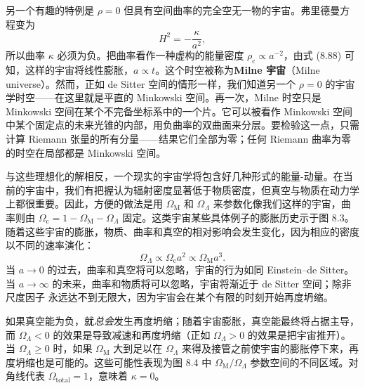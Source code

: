 另一个有趣的特例是 $\rho=0$ 但具有空间曲率的完全空无一物的宇宙。弗里德曼方程变为
\begin{equation*}
H^{2} = -\frac{\kappa}{a^{2}},
\tag{8.90}
\end{equation*}
所以曲率 $\kappa$ 必须为负。把曲率看作一种虚构的能量密度 $\rho_{\mathrm{c}}\propto a^{-2}$，由式 (8.88) 可知，这样的宇宙将线性膨胀，$a\propto t$。这个时空被称为\textbf{Milne 宇宙}（Milne universe）。然而，正如 de Sitter 空间的情形一样，我们知道另一个 $\rho=0$ 的宇宙学时空——在这里就是平直的 Minkowski 空间。再一次，Milne 时空只是 Minkowski 空间在某个不完备坐标系中的一个片。它可以被看作 Minkowski 空间中某个固定点的未来光锥的内部，用负曲率的双曲面来分层。要检验这一点，只需计算 Riemann 张量的所有分量——结果它们全部为零；任何 Riemann 曲率为零的时空在局部都是 Minkowski 空间。

与这些理想化的解相反，一个现实的宇宙学将包含好几种形式的能量-动量。在当前的宇宙中，我们有把握认为辐射密度显著低于物质密度，但真空与物质在动力学上都很重要。因此，方便的做法是用 $\Omega_{\mathrm{M}}$ 和 $\Omega_{\Lambda}$ 来参数化像我们这样的宇宙，曲率则由 $\Omega_{\mathrm{c}}=1-\Omega_{\mathrm{M}}-\Omega_{\Lambda}$ 固定。这类宇宙某些具体例子的膨胀历史示于图 8.3。随着这些宇宙的膨胀，物质、曲率和真空的相对影响会发生变化，因为相应的密度以不同的速率演化：
\begin{equation*}
\Omega_{\Lambda}\propto\Omega_{\mathrm{c}}a^{2}\propto\Omega_{\mathrm{M}}a^{3}.
\tag{8.91}
\end{equation*}
当 $a\to0$ 的过去，曲率和真空将可以忽略，宇宙的行为如同 Einstein--de Sitter。当 $a\to\infty$ 的未来，曲率和物质将可以忽略，宇宙将渐近于 de Sitter 空间；除非尺度因子
永远达不到无限大，因为宇宙会在某个有限的时刻开始再度坍缩。


如果真空能为负，就\emph{总会}发生再度坍缩；随着宇宙膨胀，真空能最终将占据主导，而 $\Omega_{\Lambda}<0$ 的效果是导致减速和再度坍缩（正如 $\Omega_{\Lambda}>0$ 的效果是把宇宙推开）。当 $\Omega_{\Lambda}\ge0$ 时，如果 $\Omega_{\mathrm{M}}$ 大到足以在 $\Omega_{\Lambda}$ 来得及接管之前使宇宙的膨胀停下来，再度坍缩也是可能的。这些可能性表现为图 8.4 中 $\Omega_{\mathrm{M}}/\Omega_{\Lambda}$ 参数空间的不同区域。对角线代表 $\Omega_{\mathrm{total}}=1$，意味着 $\kappa=0$。

